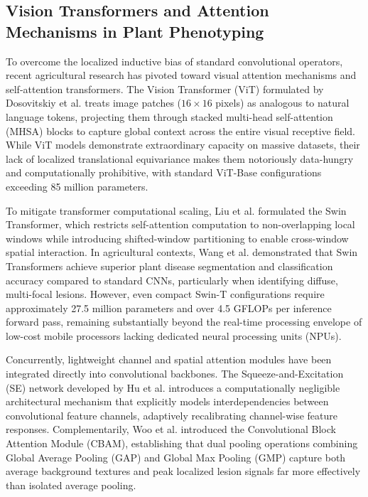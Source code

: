 \documentclass[journal,10pt,twocolumn]{IEEEtran}
\begin{document}
\subsection{Vision Transformers and Attention Mechanisms in Plant Phenotyping}
To overcome the localized inductive bias of standard convolutional operators, recent agricultural research has pivoted toward visual attention mechanisms and self-attention transformers. The Vision Transformer (ViT) formulated by Dosovitskiy et al. \cite{dosovitskiy2021image} treats image patches ($16 \times 16$ pixels) as analogous to natural language tokens, projecting them through stacked multi-head self-attention (MHSA) blocks to capture global context across the entire visual receptive field. While ViT models demonstrate extraordinary capacity on massive datasets, their lack of localized translational equivariance makes them notoriously data-hungry and computationally prohibitive, with standard ViT-Base configurations exceeding 85 million parameters.

To mitigate transformer computational scaling, Liu et al. \cite{liu2021swin} formulated the Swin Transformer, which restricts self-attention computation to non-overlapping local windows while introducing shifted-window partitioning to enable cross-window spatial interaction. In agricultural contexts, Wang et al. \cite{wang2022practical} demonstrated that Swin Transformers achieve superior plant disease segmentation and classification accuracy compared to standard CNNs, particularly when identifying diffuse, multi-focal lesions. However, even compact Swin-T configurations require approximately 27.5 million parameters and over 4.5 GFLOPs per inference forward pass, remaining substantially beyond the real-time processing envelope of low-cost mobile processors lacking dedicated neural processing units (NPUs).

Concurrently, lightweight channel and spatial attention modules have been integrated directly into convolutional backbones. The Squeeze-and-Excitation (SE) network developed by Hu et al. \cite{hu2020squeeze} introduces a computationally negligible architectural mechanism that explicitly models interdependencies between convolutional feature channels, adaptively recalibrating channel-wise feature responses. Complementarily, Woo et al. \cite{woo2018cbam} introduced the Convolutional Block Attention Module (CBAM), establishing that dual pooling operations combining Global Average Pooling (GAP) and Global Max Pooling (GMP) capture both average background textures and peak localized lesion signals far more effectively than isolated average pooling.
\end{document}
